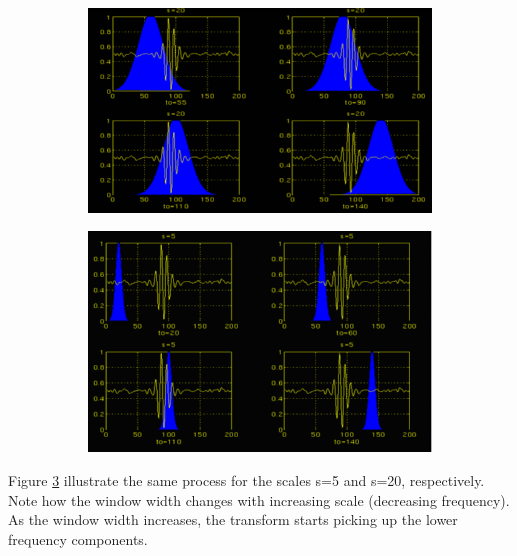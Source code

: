\documentclass[12pt, a4paper, twoside]{report}
\begin{document}
\begin{figure}[H]
    \centering
    \begin{subfigure}[b]{0.6\textwidth}
        \includegraphics[width=\textwidth]
        {images/chapter3/cwt-scale-wide}
        \caption{}
        \label{fig:cwt-scale-wide}
    \end{subfigure}

    \begin{subfigure}[b]{0.6\textwidth}
        \includegraphics[width=\textwidth]
        {images/chapter3/cwt-scale-narrow}
        \caption{}
        \label{fig:cwt-scale-narrow}
    \end{subfigure}
    \caption{}
    \label{fig:cwt-scale-comparison}
\end{figure}

Figure \ref{fig:cwt-scale-comparison} illustrate the same process for the scales s=5 and s=20, respectively. Note how the window width changes with increasing scale (decreasing frequency). As the window width increases, the transform starts picking up the lower frequency components.
\end{document}
